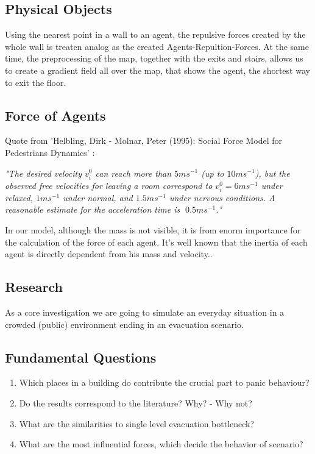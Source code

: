 \documentclass[11pt]{article}
\begin{document}
\subsection*{Physical Objects}

Using the nearest point in a wall to an agent, the repulsive forces created by the whole wall is treaten analog as the created Agents-Repultion-Forces. At the same time, the preprocessing of the map, together with the exits and stairs, allows us to create a gradient field all over the map, that shows the agent, the shortest way to exit the floor. 



\subsection*{Force of Agents}

Quote from 'Helbling, Dirk - Molnar, Peter (1995): Social Force Model for Pedestrians Dynamics' \cite{SFMPD} :

\textit{"The desired velocity $v^0_i$ can reach more than $5 ms^{-1}$ (up to $10 m s^{-1}$), but the observed free velocities	for	leaving	a	room	correspond	to	$v^0_i=6 ms^{-1}$ under relaxed, $1ms^{-1}$ under normal, and $1.5ms^{-1}$ under nervous conditions. A reasonable estimate for the acceleration time is 􏰄$0.5ms^{-1}$."}

In our model, although the mass is not visible, it is from enorm importance for the calculation of the force of each agent. It's well known that the inertia of each agent is directly dependent from his mass and velocity..



\subsection{Research}

As a core investigation we are going to simulate an everyday situation in a crowded (public) environment ending in an evacuation scenario.

\subsection{Fundamental Questions}

\begin{enumerate}
\item Which places in a building do contribute the crucial part to panic behaviour?
\item Do the results correspond to the literature? Why? - Why not?
\item What are the similarities to single level evacuation bottleneck?
\item What are the most influential forces, which decide the behavior of scenario?
 
\end{enumerate}
\end{document}
